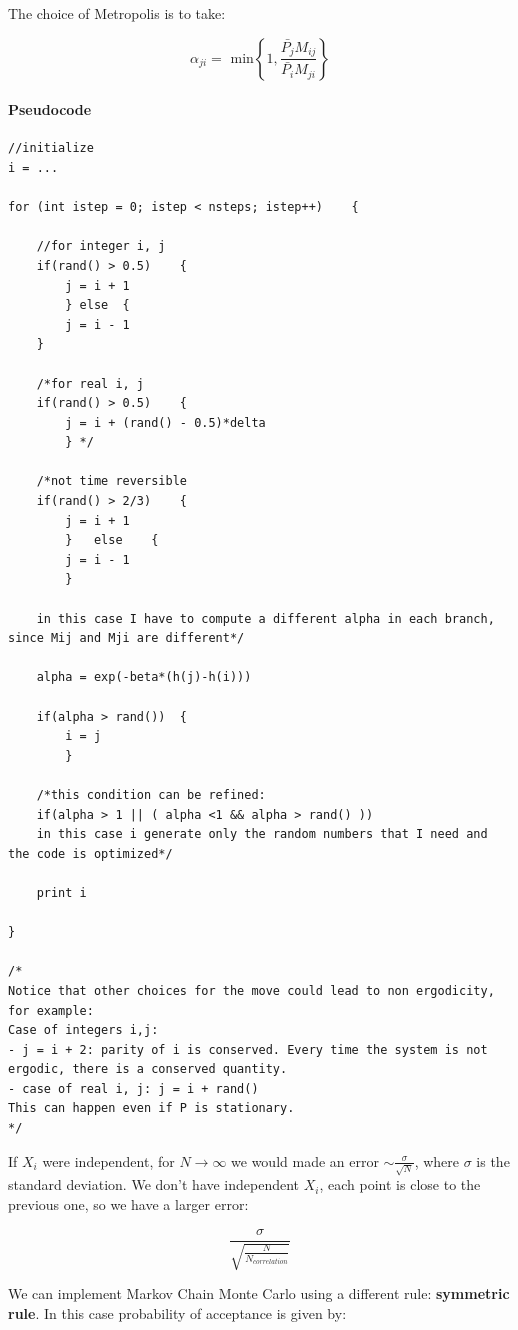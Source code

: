 \documentclass[a4paper, italian, openany]{book}
\begin{document}
The choice of Metropolis is to take:

$$\alpha_{ji} = \mbox{ min}\left \{ 1, \frac{\bar{P_j}M_{ij}}{\bar{P_i}M_{ji}} \right \}$$

\paragraph{Pseudocode}

\begin{lstlisting}
//initialize
i = ... 

for (int istep = 0; istep < nsteps; istep++)	{
	
	//for integer i, j
	if(rand() > 0.5)	{
		j = i + 1
		} else	{
		j = i - 1
	}
	
	/*for real i, j
	if(rand() > 0.5)	{
		j = i + (rand() - 0.5)*delta
		} */
		
	/*not time reversible
	if(rand() > 2/3)	{
		j = i + 1
		}	else	{
		j = i - 1
		}
		
	in this case I have to compute a different alpha in each branch, since Mij and Mji are different*/
	
	alpha = exp(-beta*(h(j)-h(i)))
	
	if(alpha > rand())	{
		i = j
		}
		
	/*this condition can be refined: 
	if(alpha > 1 || ( alpha <1 && alpha > rand() )) 
	in this case i generate only the random numbers that I need and the code is optimized*/
	
	print i
	
}

/*
Notice that other choices for the move could lead to non ergodicity, for example:
Case of integers i,j: 
- j = i + 2: parity of i is conserved. Every time the system is not ergodic, there is a conserved quantity.
- case of real i, j: j = i + rand()
This can happen even if P is stationary.
*/
\end{lstlisting}

If $X_i$ were independent, for $N \to \infty$ we would made an error $\sim \frac{\sigma}{\sqrt{N}}$, where $\sigma$ is the standard deviation.\newline
We don't have independent $X_i$, each point is close to the previous one, so we have a larger error: 

$$\frac{\sigma}{\sqrt{\frac{N}{N_{correlation}}}}$$

We can implement Markov Chain Monte Carlo using a different rule: \textbf{symmetric rule}. In this case probability of acceptance is given by:
\end{document}
